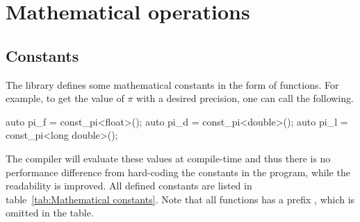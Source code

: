 \section{Mathematical operations}
\label{sec:Mathemtical operations}

\subsection{Constants}
\label{sub:Constants}

The library defines some mathematical constants in the form of
 functions. For example, to get the value of $\pi$ with a
desired precision, one can call the following.
\begin{cppcode}
  auto pi_f = const_pi<float>();
  auto pi_d = const_pi<double>();
  auto pi_l = const_pi<long double>();
\end{cppcode}
The compiler will evaluate these values at compile-time and thus there is no
performance difference from hard-coding the constants in the program, while the
readability is improved. All defined constants are listed in
table~\ref{tab:Mathematical constants}. Note that all functions has a prefix
, which is omitted in the table.

